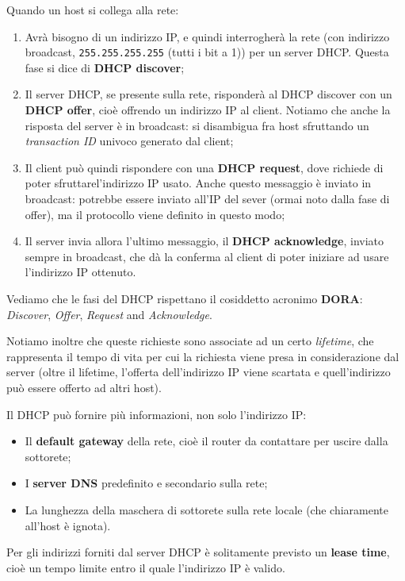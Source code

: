 \documentclass[a4paper,11pt]{article}
\begin{document}
Quando un host si collega alla rete:
\begin{enumerate}
	\item Avrà bisogno di un indirizzo IP, e quindi interrogherà la rete (con indirizzo broadcast, \lstinline|255.255.255.255| (tutti i bit a 1)) per un server DHCP. Questa fase si dice di \textbf{DHCP discover};
	\item Il server DHCP, se presente sulla rete, risponderà al DHCP discover con un \textbf{DHCP offer}, cioè offrendo un indirizzo IP al client. Notiamo che anche la risposta del server è in broadcast: si disambigua fra host sfruttando un \textit{transaction ID} univoco generato dal client;
	\item Il client può quindi rispondere con una \textbf{DHCP request}, dove richiede di poter sfruttarel'indirizzo IP usato. Anche questo messaggio è inviato in broadcast: potrebbe essere inviato all'IP del sever (ormai noto dalla fase di offer), ma il protocollo viene definito in questo modo;
	\item Il server invia allora l'ultimo messaggio, il \textbf{DHCP acknowledge}, inviato sempre in broadcast, che dà la conferma al client di poter iniziare ad usare l'indirizzo IP ottenuto.
\end{enumerate}

Vediamo che le fasi del DHCP rispettano il cosiddetto acronimo \textbf{DORA}: \textit{Discover}, \textit{Offer}, \textit{Request} and \textit{Acknowledge}.

Notiamo inoltre che queste richieste sono associate ad un certo \textit{lifetime}, che rappresenta il tempo di vita per cui la richiesta viene presa in considerazione dal server (oltre il lifetime, l'offerta dell'indirizzo IP viene scartata e quell'indirizzo può essere offerto ad altri host).

Il DHCP può fornire più informazioni, non solo l'indirizzo IP:
\begin{itemize}
	\item Il \textbf{default gateway} della rete, cioè il router da contattare per uscire dalla sottorete;
	\item I \textbf{server DNS} predefinito e secondario sulla rete;
	\item La lunghezza della maschera di sottorete sulla rete locale (che chiaramente all'host è ignota).
\end{itemize}

Per gli indirizzi forniti dal server DHCP è solitamente previsto un \textbf{lease time}, cioè un tempo limite entro il quale l'indirizzo IP è valido.
\end{document}
